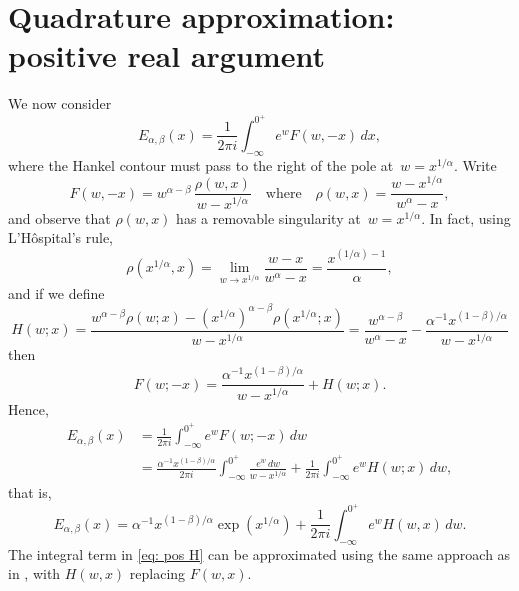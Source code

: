 \documentclass[12pt,a4paper]{article}
\begin{document}
\section{Quadrature approximation: positive real argument}
We now consider
\[
E_{\alpha,\beta}(x)=\frac{1}{2\pi i}\int_{-\infty}^{0^+}
    e^wF(w,-x)\,dx,
\]
where the Hankel contour must pass to the right of the pole at~$w=x^{1/\alpha}$.
Write
\[
F(w,-x)=w^{\alpha-\beta}\,\frac{\rho(w,x)}{w-x^{1/\alpha}}\quad\text{where}\quad
\rho(w,x)=\frac{w-x^{1/\alpha}}{w^\alpha-x},
\]
and observe that $\rho(w,x)$ has a removable singularity at~$w=x^{1/\alpha}$. 
In fact, using L'H\^ospital's rule,
\[
\rho(x^{1/\alpha},x)=\lim_{w\to x^{1/\alpha}}
    \frac{w-x}{w^\alpha-x}=\frac{x^{(1/\alpha)-1}}{\alpha},
\]
and if we define
\[
H(w;x)=\frac{w^{\alpha-\beta}\rho(w;x)
-(x^{1/\alpha})^{\alpha-\beta}\rho(x^{1/\alpha};x)}{w-x^{1/\alpha}}
    =\frac{w^{\alpha-\beta}}{w^\alpha-x}
    -\frac{\alpha^{-1}x^{(1-\beta)/\alpha}}{w-x^{1/\alpha}}
\]
then
\[
F(w;-x)=\frac{\alpha^{-1}x^{(1-\beta)/\alpha}}{w-x^{1/\alpha}}+H(w;x). 
\]
Hence,
\begin{align*}
E_{\alpha,\beta}(x)&=\frac{1}{2\pi i}\int_{-\infty}^{0^+}e^w F(w;-x)\,dw\\
    &=\frac{\alpha^{-1}x^{(1-\beta)/\alpha}}{2\pi i}\int_{-\infty}^{0^+}
    \frac{e^w\,dw}{w-x^{1/\alpha}}
    +\frac{1}{2\pi i}\int_{-\infty}^{0^+}e^w H(w;x)\,dw,
\end{align*}
that is,
\begin{equation}\label{eq: pos H}
E_{\alpha,\beta}(x)=\alpha^{-1}x^{(1-\beta)/\alpha}\exp(x^{1/\alpha})
    +\frac{1}{2\pi i}\int_{-\infty}^{0^+}e^w H(w,x)\,dw.
\end{equation}
The integral term in \eqref{eq: pos H} can be approximated using the same 
approach as in , with $H(w,x)$ replacing $F(w,x)$.
\end{document}
